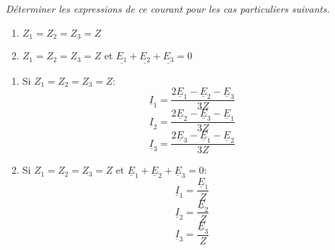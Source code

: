 \Question
{%
\textit{Déterminer les expressions de ce courant pour les cas particuliers suivants.}
\begin{enumerate}
\item $Z_{1}=Z_{2}=Z_{3}=Z$
\item $Z_{1}=Z_{2}=Z_{3}=Z$ et $\underline{E_{1}}+\underline{E_{2}}+\underline{E_{3}}=0$\\
\end{enumerate}
}
{%

\begin{enumerate}
\item Si $Z_{1}=Z_{2}=Z_{3}=Z$:
$$\underline{I}_{1}=\frac{2\underline{E}_{1}-\underline{E}_{2}-\underline{E}_{3}}{3Z}$$
$$\underline{I}_{2}=\frac{2\underline{E}_{2}-\underline{E}_{3}-\underline{E}_{1}}{3Z}$$
$$\underline{I}_{3}=\frac{2\underline{E}_{3}-\underline{E}_{1}-\underline{E}_{2}}{3Z}$$

\item Si $Z_{1}=Z_{2}=Z_{3}=Z$ et $\underline{E}_{1}+\underline{E}_{2}+\underline{E}_{3}=0$:
$$\underline{I}_{1}=\frac{\underline{E}_{1}}{Z}$$
$$\underline{I}_{2}=\frac{\underline{E}_{2}}{Z}$$
$$\underline{I}_{3}=\frac{\underline{E}_{3}}{Z}$$
\end{enumerate}
}
{%
}



